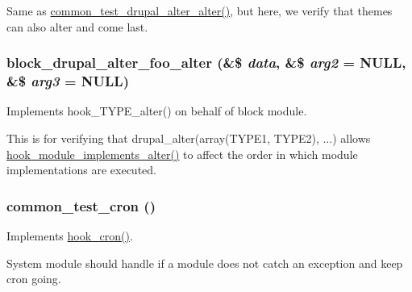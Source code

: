 Same as \hyperlink{common__test_8module_a47684f53dbcdd2a299c3e9fa834fe7d7}{common\_\-test\_\-drupal\_\-alter\_\-alter()}, but here, we verify that themes can also alter and come last. \hypertarget{common__test_8module_a0ea8b96fa8bf0e390240e4a010208ec9}{
\subsubsection[{block\_\-drupal\_\-alter\_\-foo\_\-alter}]{\setlength{\rightskip}{0pt plus 5cm}block\_\-drupal\_\-alter\_\-foo\_\-alter (\&\$ {\em data}, \/  \&\$ {\em arg2} = {\ttfamily NULL}, \/  \&\$ {\em arg3} = {\ttfamily NULL})}}
\label{common__test_8module_a0ea8b96fa8bf0e390240e4a010208ec9}
Implements hook\_\-TYPE\_\-alter() on behalf of block module.

This is for verifying that drupal\_\-alter(array(TYPE1, TYPE2), ...) allows \hyperlink{group__hooks_gab71c322e6487a3b99bd04c5b9adb13f6}{hook\_\-module\_\-implements\_\-alter()} to affect the order in which module implementations are executed. \hypertarget{common__test_8module_af635bc632ff8fae03cc7ffc65262b065}{
\subsubsection[{common\_\-test\_\-cron}]{\setlength{\rightskip}{0pt plus 5cm}common\_\-test\_\-cron ()}}
\label{common__test_8module_af635bc632ff8fae03cc7ffc65262b065}
Implements \hyperlink{group__hooks_gaf07f1e3d98112fc2ba6920cf7ee6fb16}{hook\_\-cron()}.

System module should handle if a module does not catch an exception and keep cron going.

